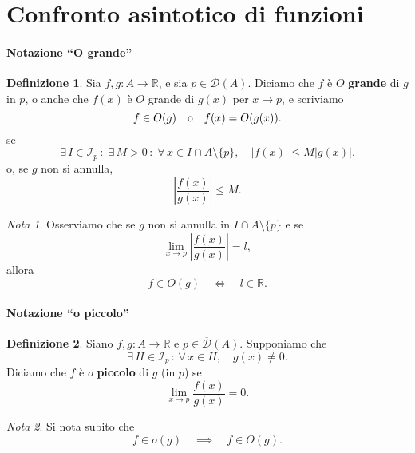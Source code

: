 \documentclass{article}
\theoremstyle{plain}
\theoremstyle{definition}
\newtheorem{defn}{Definizione}[section]
\theoremstyle{remark}
\newtheorem{note}{Nota}
\begin{document}
\vspace{50pt}
\section{Confronto asintotico di funzioni}
\vspace{50pt}

\paragraph{Notazione “O grande”}
\begin{bxthm}
\begin{defn}
    Sia $f,g:A\to\mathbb{R}$, e sia $p\in\overline{\mathcal{D}}(A)$. 
    Diciamo che $f$ è $O$ \textbf{grande} di $g$ in $p$, o anche che $f(x)$ è $O$ grande di $g(x)$ per $x\to p$, e scriviamo 
    \[f\in O(g)\quad\textup{o}\quad f(x)= O(g(x)).\]
    se 
    \[\exists\, I\in\mathcal{I}_p\,:\; \exists\, M>0\,:\;\forall\, x\in I\cap A\setminus\{p\},\quad|f(x)|\leq M|g(x)|.\]
    o, se $g$ non si annulla, \[\left|\dfrac{f(x)}{g(x)}\right|\leq M.\]
\end{defn}
\end{bxthm}

\vspace{10pt}

\begin{note}
    Osserviamo che se $g$ non si annulla in $I\cap A\setminus\{p\}$ e se 
    \[\lim_{x\to p}\left|\dfrac{f(x)}{g(x)}\right|=l,\] 
    allora 
    \[f\in O(g)\quad\iff\quad l\in\mathbb{R}.\]
\end{note}

\vspace{10pt}

\paragraph{Notazione “o piccolo”}
\begin{bxthm}
\begin{defn}
    Siano $f,g:A\to\mathbb{R}$ e $p\in\overline{\mathcal{D}}(A)$. 
    Supponiamo che 
    \[\exists\, H\in \mathcal{I}_p\,:\,\forall\, x\in H,\quad g(x)\neq0.\]
    Diciamo che $f$ è $o$ \textbf{piccolo} di $g$ (in $p$) se 
    \[\lim_{x\to p}\dfrac{f(x)}{g(x)}=0.\]    
\end{defn}
\end{bxthm}

\vspace{10pt}

\begin{note}
    Si nota subito che \[f\in o(g)\quad\implies\quad f\in O(g).\]
\end{note}
\end{document}

